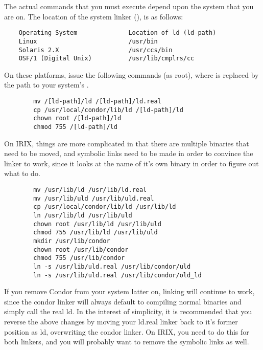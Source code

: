 The actual commands that you must execute depend upon the system that you
are on.  The location of the system linker (), is as follows:
\begin{verbatim}
	Operating System              Location of ld (ld-path)
	Linux                         /usr/bin
	Solaris 2.X                   /usr/ccs/bin
	OSF/1 (Digital Unix)          /usr/lib/cmplrs/cc
\end{verbatim}

On these platforms, issue the following commands (as root), where
 is replaced by the path to your system's .
\begin{verbatim}
        mv /[ld-path]/ld /[ld-path]/ld.real
        cp /usr/local/condor/lib/ld /[ld-path]/ld
        chown root /[ld-path]/ld
        chmod 755 /[ld-path]/ld
\end{verbatim}

On IRIX, things are more complicated in that there are multiple
 binaries that need to be moved, and symbolic links need to
be made in order to convince the linker to work, since it looks at the
name of it's own binary in order to figure out what to do.
\begin{verbatim}
        mv /usr/lib/ld /usr/lib/ld.real
        mv /usr/lib/uld /usr/lib/uld.real
        cp /usr/local/condor/lib/ld /usr/lib/ld
        ln /usr/lib/ld /usr/lib/uld
        chown root /usr/lib/ld /usr/lib/uld
        chmod 755 /usr/lib/ld /usr/lib/uld
        mkdir /usr/lib/condor
        chown root /usr/lib/condor
        chmod 755 /usr/lib/condor
        ln -s /usr/lib/uld.real /usr/lib/condor/uld
        ln -s /usr/lib/uld.real /usr/lib/condor/old_ld
\end{verbatim}

If you remove Condor from your system latter on, linking will continue
to work, since the condor linker will always default to compiling
normal binaries and simply call the real ld.  In the interest of
simplicity, it is recommended that you reverse the above changes by
moving your ld.real linker back to it's former position as ld,
overwriting the condor linker.  On IRIX, you need to do this for both
linkers, and you will probably want to remove the symbolic links as
well.

